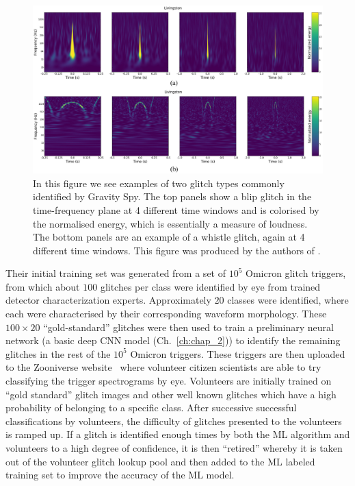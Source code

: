 %
%
\begin{figure}
    \centering
    \includegraphics[width=\linewidth]{figures/gravity_spy_glitches.jpeg}
    \caption[An example of two glitches commonly identified by Gravity Spy 
    (blip and whistle)]{ In this figure we see examples of two glitch types 
    commonly identified by Gravity Spy. The top panels show a blip glitch in the 
    time-frequency plane at 4 different time windows 
    and is colorised by the normalised energy, which is 
    essentially a measure of loudness. The bottom panels are an example of a 
    whistle glitch, again at 4 different time windows. This figure was produced by the authors of \cite{0264-9381-34-6-064003}.}
    \label{fig:gravity_spy_glitch}
\end{figure}

%
%
Their initial training set was generated from a set of $10^5$ Omicron 
glitch triggers, from which about $100$ glitches per class were 
identified by eye from trained detector characterization experts. 
Approximately $20$ classes were identified, where each were characterised 
by their corresponding waveform morphology. These $100 \times 20$
``gold-standard'' glitches were then used to train a preliminary neural 
network (a basic deep \ac{CNN} model (Ch.~\ref{ch:chap_2})) to 
identify the remaining glitches in the rest of the $10^5$ Omicron triggers. 
These triggers are then uploaded to the Zooniverse 
website~\cite{zooniverse.org} where volunteer citizen scientists are 
able to try classifying the trigger spectrograms by eye. Volunteers are 
initially trained on ``gold standard'' glitch images and other well known 
glitches which have a high probability of belonging to a specific class. 
After successive successful classifications by volunteers, the 
difficulty of glitches presented to the volunteers is ramped up. If a 
glitch is identified enough times by both the \ac{ML} algorithm and 
volunteers to a high degree of confidence, it is then ``retired'' 
whereby it is taken out of the volunteer glitch lookup pool and then 
added to the \ac{ML} labeled training set to improve the accuracy 
of the \ac{ML} model.

